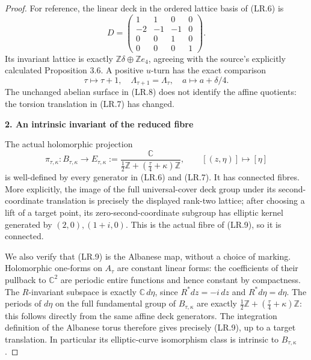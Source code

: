 \begin{proof}
For reference, the linear deck in the ordered lattice basis of
(LR.6) is
\[
 D=\begin{pmatrix}
 1&1&0&0\\-2&-1&-1&0\\0&0&1&0\\0&0&0&1
 \end{pmatrix}.
\]
Its invariant lattice is exactly
\(\mathbb Z\delta\oplus\mathbb Z e_4\), agreeing with the
source's explicitly calculated Proposition 3.6.
A positive \(u\)-turn has the exact comparison
\[
 \tau\longmapsto\tau+1,
 \quad \Lambda_{\tau+1}=\Lambda_\tau,
 \quad a\longmapsto a+\delta/4.                      \tag{LR.8}
\]
The unchanged abelian surface in (LR.8) does not identify the affine
quotients: the torsion translation in (LR.7) has changed.

\par

\medskip\noindent\textbf{2. An intrinsic invariant of the reduced fibre}

\par\nobreak

The actual holomorphic projection
\[
 \pi_{\tau,\kappa}:B_{\tau,\kappa}\longrightarrow
 E_{\tau,\kappa}:=
 \frac{\mathbb C}{\frac12\mathbb Z+
                       (\frac\tau4+\kappa)\mathbb Z},
 \qquad [(z,\eta)]\longmapsto[\eta]                  \tag{LR.9}
\]
is well-defined by every generator in (LR.6) and (LR.7).
It has connected fibres. More explicitly, the image of the full
universal-cover deck group under its second-coordinate translation
is precisely the displayed rank-two lattice; after choosing a lift
of a target point, its zero-second-coordinate subgroup has elliptic
kernel generated by \((2,0),(1+i,0)\). This is the actual fibre of
(LR.9), so it is connected.

We also verify that (LR.9) is the Albanese map, without a choice of
marking. Holomorphic one-forms on \(A_\tau\) are constant linear
forms: the coefficients of their pullback to \(\mathbb C^2\) are
periodic entire functions and hence constant by compactness. The
\(R\)-invariant subspace is exactly \(\mathbb C\,d\eta\), since
\(R^*dz=-i\,dz\) and \(R^*d\eta=d\eta\). The periods of
\(d\eta\) on the full fundamental group of \(B_{\tau,\kappa}\)
are exactly \(\frac12\mathbb Z+(\frac\tau4+\kappa)\mathbb Z\):
this follows directly from the same affine deck generators. The
integration definition of the Albanese torus therefore gives
precisely (LR.9), up to a target translation. In particular its
elliptic-curve isomorphism class is intrinsic to \(B_{\tau,\kappa}\).


\end{proof}
